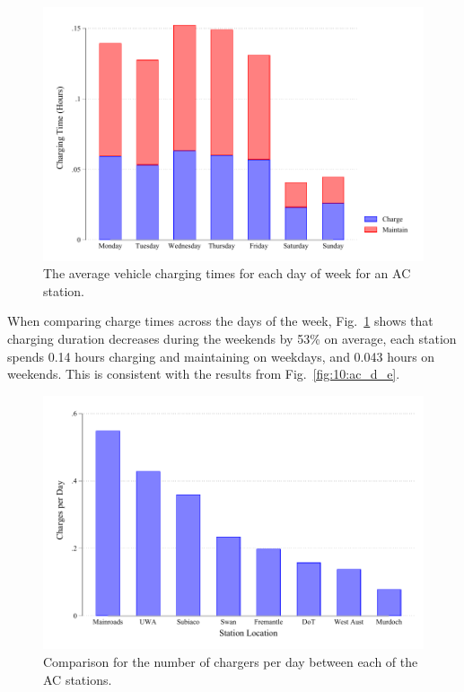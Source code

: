 \begin{figure}[H]
	\centering
	\includegraphics[width=0.8\linewidth]{ac_d_h}
	\caption[Time taken to AC charge a vehicle for each day of week]{The average vehicle charging times for each day of week for an AC station.}%
	\label{fig:10:ac_d_h}
\end{figure}


When comparing charge times across the days of the week, Fig.~\ref{fig:10:ac_d_h} shows that charging duration decreases during the weekends by 53\% on average, each station spends 0.14 hours charging and maintaining on weekdays, and 0.043 hours on weekends. This is consistent with the results from Fig.~\ref{fig:10:ac_d_e}.

\begin{figure}[H]
	\centering
	\includegraphics[width=0.8\linewidth]{ac_p_c}
	\caption[Number of chargers per day between each AC station]{Comparison for the number of chargers per day between each of the AC stations.}
	\label{fig:10:ac_p_c}
\end{figure}

